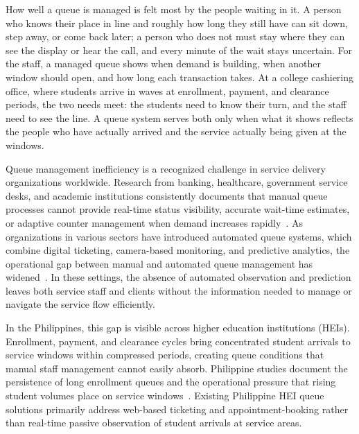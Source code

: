 \documentclass{research}
\begin{document}
How well a queue is managed is felt most by the people waiting in it.
A person who knows their place in line and roughly how long they still
have can sit down, step away, or come back later; a person who does
not must stay where they can see the display or hear the call, and
every minute of the wait stays uncertain. For the staff, a managed
queue shows when demand is building, when another window should open,
and how long each transaction takes. At a college cashiering office,
where students arrive in waves at enrollment, payment, and clearance
periods, the two needs meet: the students need to know their turn, and
the staff need to see the line. A queue system serves both only when
what it shows reflects the people who have actually arrived and the
service actually being given at the windows.

Queue management inefficiency is a recognized challenge in service delivery organizations worldwide. Research from banking, healthcare, government service desks, and academic institutions consistently documents that manual queue processes cannot provide real-time status visibility, accurate wait-time estimates, or adaptive counter management when demand increases rapidly~\cite{nair2025survey,batcharo2025smart,yifter2023modeling}. As organizations in various sectors have introduced automated queue systems, which combine digital ticketing, camera-based monitoring, and predictive analytics, the operational gap between manual and automated queue management has widened~\cite{rashid2023smartqueue,zou2026customer}. In these settings, the absence of automated observation and prediction leaves both service staff and clients without the information needed to manage or navigate the service flow efficiently.

In the Philippines, this gap is visible across higher education institutions (HEIs). Enrollment, payment, and clearance cycles bring concentrated student arrivals to service windows within compressed periods, creating queue conditions that manual staff management cannot easily absorb. Philippine studies document the persistence of long enrollment queues and the operational pressure that rising student volumes place on service windows~\cite{concepcion2026smart,mallari2022clique,rrlcomp023automatedenrollmentqueueing,rrlcomp025lineuclmenhancing}. Existing Philippine HEI queue solutions primarily address web-based ticketing and appointment-booking rather than real-time passive observation of student arrivals at service areas.
\end{document}
